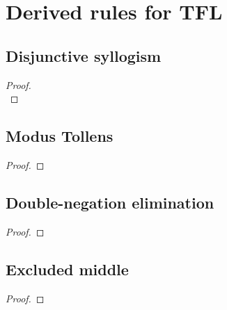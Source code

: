 \newpage
\section{Derived rules for TFL}
\begin{multicols}{2}
\subsection*{Disjunctive syllogism}
\begin{proof}

\\	
\end{proof}

\subsection*{Modus Tollens}

\begin{proof}
	 
\end{proof}

\subsection*{Double-negation elimination}
	\begin{proof}
	\end{proof}


\subsection*{Excluded middle}
	\begin{proof}
		\open
		\close
		\open
		\close
	\end{proof}

%
%


\end{multicols}
